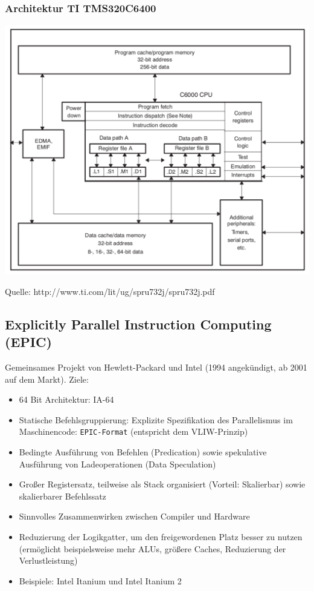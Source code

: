 \subsubsection{Architektur TI TMS320C6400}
\includegraphics[scale=0.35]{mikroprozessoren2/TI-TMS320C64x.pdf}

Quelle: http://www.ti.com/lit/ug/spru732j/spru732j.pdf


\subsection{Explicitly Parallel Instruction Computing (EPIC)}
Gemeinsames Projekt von Hewlett-Packard und Intel (1994 angekündigt, ab 2001 auf dem Markt). Ziele:
\begin{itemize}
	\item 64 Bit Architektur: IA-64
	\item Statische Befehlsgruppierung: Explizite Spezifikation des Parallelismus im Maschinencode: \texttt{EPIC-Format} (entspricht dem VLIW-Prinzip)
	\item Bedingte Ausführung von Befehlen (Predication) sowie spekulative Ausführung von Ladeoperationen (Data Speculation)
	\item Großer Registersatz, teilweise als Stack organisiert (Vorteil: Skalierbar) sowie skalierbarer Befehlssatz
	\item Sinnvolles Zusammenwirken zwischen Compiler und Hardware
	\item Reduzierung der Logikgatter, um den freigewordenen Platz besser zu nutzen (ermöglicht beispielsweise mehr ALUs, größere Caches, Reduzierung der Verlustleistung)
	\item Beispiele: Intel Itanium und Intel Itanium 2
\end{itemize}

